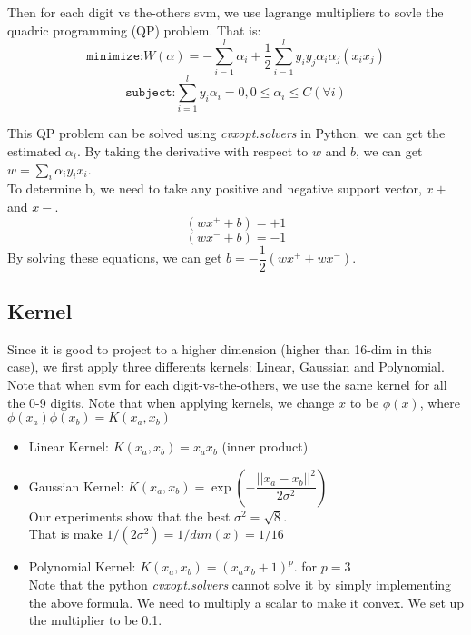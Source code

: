 \documentclass{article}
\begin{document}
Then for each digit vs the-others svm, we use lagrange multipliers to sovle the quadric programming (QP) problem. That is:
\begin{equation*}
\texttt{minimize:} W(\alpha) =-\sum_{i=1}^l \alpha_i +\dfrac{1}{2}\sum_{i=1}^ly_iy_j\alpha_i\alpha_j(x_ix_j)
\end{equation*}
\begin{equation*}
\texttt{subject:} \sum_{i=1}^ly_i\alpha_i=0, 0\leq\alpha_i\leq C (\forall i)
\end{equation*}

This QP problem can be solved using \textit{cvxopt.solvers} in Python. we can get the estimated $\alpha_i$. 
By taking the derivative with respect to $w$ and $b$, we can get $w=\sum_i \alpha_iy_ix_i$.\\

To determine b, we need to take any positive and negative support vector, $x+$ and $x-$. 
\[(wx^+ +b)=+1\]
\[(wx^- +b)=-1\]
By solving these equations, we can get $b=-\dfrac{1}{2}(wx^+ +wx^-)$.

\subsection{Kernel}
Since it is good to project to a higher dimension (higher than 16-dim in this case), we first apply three differents kernels: Linear, Gaussian and Polynomial. Note that when svm for each digit-vs-the-others, we use the same kernel for all the 0-9 digits. Note that when applying kernels, we change $x$ to be $\phi(x)$, where $\phi(x_a)\phi(x_b)=K(x_a,x_b)$ \\


\begin{itemize}
\item Linear Kernel: $K(x_a,x_b)=x_ax_b$ (inner product) \\
\item Gaussian Kernel: $K(x_a,x_b)=\exp (-\dfrac{||x_a-x_b||^2}{2 \sigma^2} )$ \\
  Our experiments show that the best $\sigma^2= \sqrt{8}$. \\
  That is make $1/(2\sigma^2)=1/dim(x)=1/16$
  
\item Polynomial Kernel:  $K(x_a,x_b)=(x_ax_b+1)^p$. for $p =3$ \\
Note that the python \textit{cvxopt.solvers} cannot solve it by simply implementing the above formula. We need to multiply a scalar to make it convex. We set up the multiplier to be 0.1. 
\end{itemize}
\end{document}
